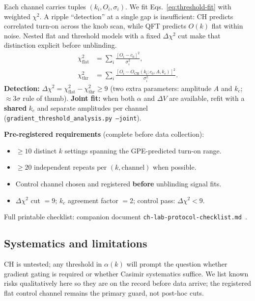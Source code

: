 \documentclass[11pt,a4paper]{article}
\begin{document}
Each channel carries tuples $(k_i, O_i, \sigma_i)$.
We fit Eqs.~\ref{eq:threshold-fit} with weighted $\chi^2$.
A ripple ``detection'' at a single gap is insufficient: CH predicts correlated turn-on across the knob scan, while QFT predicts $O(k)$ flat within noise.
Nested flat and threshold models with a fixed $\Delta\chi^2$ cut make that distinction explicit before unblinding.
\begin{align}
  \chi^2_{\mathrm{flat}} &= \sum_i \frac{[O_i - c_0]^2}{\sigma_i^2}, \\
  \chi^2_{\mathrm{thr}} &= \sum_i \frac{[O_i - O_{\mathrm{CH}}(k_i; c_0, A, k_c)]^2}{\sigma_i^2}.
\end{align}
\textbf{Detection:} $\Delta\chi^2 = \chi^2_{\mathrm{flat}} - \chi^2_{\mathrm{thr}} \geq 9$ (two extra parameters: amplitude $A$ and $k_c$; $\approx 3\sigma$ rule of thumb).
\textbf{Joint fit:} when both $\alpha$ and $\Delta V$ are available, refit with a \textbf{shared} $k_c$ and separate amplitudes per channel (\texttt{gradient\_threshold\_analysis.py --joint}).

\textbf{Pre-registered requirements} (complete before data collection):
\begin{itemize}[leftmargin=*]
  \item $\geq 10$ distinct $k$ settings spanning the GPE-predicted turn-on range.
  \item $\geq 20$ independent repeats per $(k, \text{channel})$ when possible.
  \item Control channel chosen and registered \textbf{before} unblinding signal fits.
  \item $\Delta\chi^2$ cut $= 9$; $k_c$ agreement factor $= 2$; control pass: $\Delta\chi^2 < 9$.
\end{itemize}

Full printable checklist: companion document \texttt{ch-lab-protocol-checklist.md}~\cite{CHSpaceFabric2026}.

\subsection{Systematics and limitations}
\label{sec:systematics}

CH is untested; any threshold in $\alpha(k)$ will prompt the question whether gradient gating is required or whether Casimir systematics suffice.
We list known risks qualitatively here so they are on the record before data arrive; the registered flat control channel remains the primary guard, not post-hoc cuts.
\end{document}
